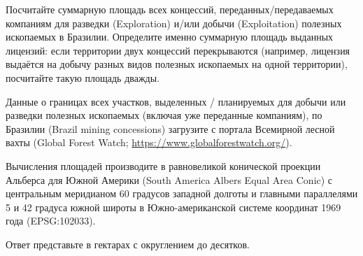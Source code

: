 
Посчитайте суммарную площадь всех концессий, переданных/передаваемых компаниям для разведки (Exploration) и/или добычи (Exploitation) полезных ископаемых в Бразилии. Определите именно суммарную площадь выданных лицензий: если территории двух концессий перекрываются (например, лицензия выдаётся на добычу разных видов полезных ископаемых на одной территории), посчитайте такую площадь дважды.

Данные о границах всех участков, выделенных / планируемых для добычи или разведки полезных ископаемых 
(включая уже переданные компаниям), по Бразилии (Brazil mining concessions) загрузите с портала Всемирной 
лесной вахты (Global Forest Watch; \url{https://www.globalforestwatch.org/}).

Вычисления площадей производите в равновеликой конической проекции Альберса для Южной Америки (South America Albers Equal Area Conic) с центральным меридианом 60 градусов западной долготы и главными параллелями 5 и 42 градуса южной широты в Южно-американской системе координат 1969 года (EPSG:102033). 

Ответ представьте в гектарах с округлением до десятков.